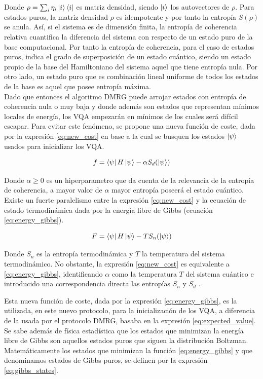 Donde $\rho=\sum_{i} \eta_{i} \ket{i}\bra{i}$ es matriz densidad, siendo $\ket{i}$ los autovectores de $\rho$. Para estados puros, la matriz densidad $\rho$ es idempotente y por tanto la entropía $S(\rho)$ se anula. Así, si el sistema es de dimensión finita, la entropía de coherencia relativa cuantifica la diferencia del sistema con respecto de un estado puro de la base computacional. Por tanto la entropía de coherencia, para el caso de estados puros, indica el grado de superposición de un estado cuántico, siendo un estado propio de la base del Hamiltoniano del sistema aquel que tiene entropía nula. Por otro lado, un estado puro que es combinación lineal uniforme de todos los estados de la base es aquel que posee entropía máxima.\\

Dado que entonces el algoritmo DMRG puede arrojar estados con entropía de coherencia nula o muy baja y donde además son estados que representan mínimos locales de energía, los VQA empezarán en mínimos de los cuales será difícil escapar. Para evitar este fenómeno, se propone una nueva función de coste, dada por la expresión \ref{eq:new_cost} en base a la cual se busquen los estados $\ket{\psi}$ usados para inicializar los VQA. 

\begin{equation}
    f = \bra{\psi}H\ket{\psi} - \alpha S_{d}(\ket{\psi})
    \label{eq:new_cost}
\end{equation}

Donde $\alpha\geq 0$ es un hiperparametro que da cuenta de la relevancia de la entropía de coherencia, a mayor valor de $\alpha$ mayor entropía poseerá el estado cuántico. Existe un fuerte paralelismo entre la expresión \ref{eq:new_cost} y la ecuación de estado termodinámica dada por la energía libre de Gibbs (ecuación \ref{eq:energy_gibbs}).

\begin{equation}
    F = \bra{\psi}H\ket{\psi} - T S_{n}(\ket{\psi})
    \label{eq:energy_gibbs}
\end{equation}

Donde $S_{n}$ es la entropía termodinámica y $T$ la temperatura del sistema termodinámico. No obstante, la expresión \ref{eq:new_cost} es equivalente a \ref{eq:energy_gibbs}, identificando $\alpha$ como la temperatura $T$ del sistema cuántico e introducido una correspondencia directa las entropías $S_{n}$  y $S_{d}$ \citep{polkovnikov}. 

\newpage

Esta nueva función de coste, dada por la expresión \ref{eq:energy_gibbs}, es la utilizada, en este nuevo protocolo, para la inicialización de los VQA, a diferencia de la usada por el protocolo DMRG, basaba en la expresión \ref{eq:expected_value}. Se sabe además de física estadística que los estados que minimizan la energía libre de Gibbs son aquellos estados puros que siguen la distribución Boltzman. Matemáticamente los estados que minimizan la función \ref{eq:energy_gibbs} y que denominamos estados de Gibbs puros, se definen por la expresión \ref{eq:gibbs_states}.

